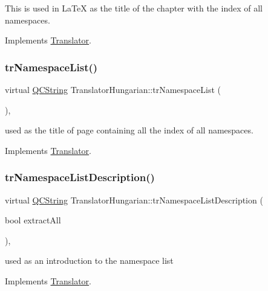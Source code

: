 This is used in La\+TeX as the title of the chapter with the index of all namespaces. 

Implements \mbox{\hyperlink{class_translator}{Translator}}.

\mbox{\label{class_translator_hungarian_adfde4319c7dbd69831f501e4d64087bd}} 
\subsubsection{\texorpdfstring{trNamespaceList()}{trNamespaceList()}}
{\footnotesize\ttfamily virtual \mbox{\hyperlink{class_q_c_string}{Q\+C\+String}} Translator\+Hungarian\+::tr\+Namespace\+List (\begin{DoxyParamCaption}{ }\end{DoxyParamCaption})\hspace{0.3cm}{\ttfamily [inline]}, {\ttfamily [virtual]}}

used as the title of page containing all the index of all namespaces. 

Implements \mbox{\hyperlink{class_translator}{Translator}}.

\mbox{\label{class_translator_hungarian_a584eac18117542793933c09fd025f4e8}} 
\subsubsection{\texorpdfstring{trNamespaceListDescription()}{trNamespaceListDescription()}}
{\footnotesize\ttfamily virtual \mbox{\hyperlink{class_q_c_string}{Q\+C\+String}} Translator\+Hungarian\+::tr\+Namespace\+List\+Description (\begin{DoxyParamCaption}\item[{bool}]{extract\+All }\end{DoxyParamCaption})\hspace{0.3cm}{\ttfamily [inline]}, {\ttfamily [virtual]}}

used as an introduction to the namespace list 

Implements \mbox{\hyperlink{class_translator}{Translator}}.

